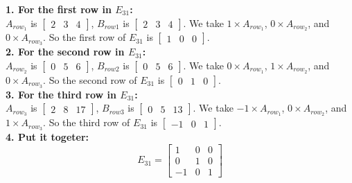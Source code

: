 \begin{mdframed}
    \baselineskip
    \noindent \textbf{1. For the first row in $E_{31}$:} \\
    $A_{row_{1}}$ is $\begin{bmatrix}
            2 & 3 & 4
        \end{bmatrix}$, $B_{row{1}}$ is $\begin{bmatrix}
            2 & 3 & 4
        \end{bmatrix}$. We take $1 \times A_{row_{1}}$, $0 \times A_{row_{2}}$, and $0 \times A_{row_{3}}$. So the first row of $E_{31}$ is $\begin{bmatrix}
            1 & 0 & 0
        \end{bmatrix}$. \\
    \noindent \textbf{2. For the second row in $E_{31}$:} \\
    $A_{row_{2}}$ is $\begin{bmatrix}
            0 & 5 & 6
        \end{bmatrix}$, $B_{row{2}}$ is $\begin{bmatrix}
            0 & 5 & 6
        \end{bmatrix}$. We take $0 \times A_{row_{1}}$, $1 \times A_{row_{2}}$, and $0 \times A_{row_{3}}$. So the second row of $E_{31}$ is $\begin{bmatrix}
            0 & 1 & 0
        \end{bmatrix}$. \\
    \noindent \textbf{3. For the third row in $E_{31}$:} \\
    $A_{row_{3}}$ is $\begin{bmatrix}
            2 & 8 & 17
        \end{bmatrix}$, $B_{row{3}}$ is $\begin{bmatrix}
            0 & 5 & 13
        \end{bmatrix}$. We take $-1 \times A_{row_{1}}$, $0 \times A_{row_{2}}$, and $1 \times A_{row_{3}}$. So the third row of $E_{31}$ is $\begin{bmatrix}
            -1 & 0 & 1
        \end{bmatrix}$. \\
    \noindent \textbf{4. Put it togeter:}
    \[
        E_{31} =
        \begin{bmatrix}
            1  & 0 & 0 \\
            0  & 1 & 0 \\
            -1 & 0 & 1
        \end{bmatrix}
    \]
\end{mdframed}


